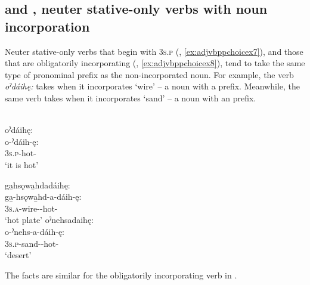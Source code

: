 \subsection{ and , neuter stative-only verbs with noun incorporation} \label{[o-V] and obligatorily incorporating neuter stative-only verbs with noun incorporation}
Neuter stative-only verbs that begin with  \textsc{3s.p} (, \ref{ex:adjvbppchoicex7}), and those that are obligatorily incorporating (, \ref{ex:adjvbppchoicex8}), tend to take the same type of pronominal prefix as the non-incorporated noun. For example, the  verb \textit{oˀdáihę:}  takes  when it incorporates  ‘wire’ -- a noun with a  prefix. Meanwhile, the same verb takes  when it incorporates  ‘sand’ -- a noun with an  prefix.

\ea\label{ex:adjvbppchoicex7} \\
\ea oˀdáihę: \\
\gll o-ˀdáih-ę:\\ 
\textsc{3s.p}-hot-{\stative} \\
\glt ‘it is hot’ 

\ex ga̱hsǫwa̱hdadáihę:\\
\gll ga̱-hsǫwa̱hd-a-dáih-ę:\\
 \textsc{3s.a}-wire-{\joinerA}-hot-{\stative}\\
\glt `hot plate'
\ex oˀnehsadaihę:\\
\gll o-ˀnehs-a-dáih-ę:\\
 \textsc{3s.p}-sand-{\joinerA}-hot-{\stative}\\
\glt `desert'
\z
\z

The facts are similar for the obligatorily incorporating verb in .


